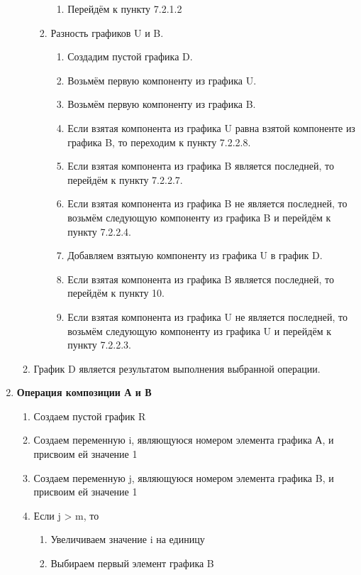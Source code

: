 \documentclass[a4paper,12pt]{extarticle}
\begin{document}
\begin{enumerate}
\begin{enumerate}[label*=\arabic*.]
\begin{enumerate}[label*=\arabic*.]
\begin{enumerate}[label*=\arabic*.]
          \item Перейдём к пункту 7.2.1.2
        \end{enumerate}
      \item Разность графиков U и B.
        \begin{enumerate}[label*=\arabic*.]
          \item Создадим пустой графика D.
          \item Возьмём первую компоненту из графика U.
          \item Возьмём первую компоненту из графика B.
          \item Если взятая компонента из графика U равна взятой компоненте из графика B, то переходим к пункту 7.2.2.8.
          \item Если взятая компонента из графика B является последней, то перейдём к пункту 7.2.2.7.
          \item Если взятая компонента из графика B не является последней, то возьмём следующую компоненту из графика B и перейдём к пункту 7.2.2.4.
          \item Добавляем взятыую компоненту из графика U в график D.
          \item Если взятая компонента из графика B является последней, то перейдём к пункту 10.
          \item Если взятая компонента из графика U не является последней, то возьмём следующую компоненту из графика U и перейдём к пункту 7.2.2.3.
        \end{enumerate}
      \end{enumerate}
    \item График D является результатом выполнения выбранной операции.
    \end{enumerate}
  \item \textbf{Операция композиции А и В}
    \begin{enumerate}[label*=\arabic*.]
    \item Создаем пустой график R
    \item Создаем переменную i, являющуюся номером элемента графика А, и присвоим ей значение 1
    \item Создаем переменную j, являющуюся номером элемента графика B, и присвоим ей значение 1
    \item Если j > m, то
        \begin{enumerate}[label*=\arabic*.]
            \item Увеличиваем значение i на единицу
            \item Выбираем первый элемент графика B

\end{enumerate}
\end{enumerate}
\end{enumerate}
\end{document}

